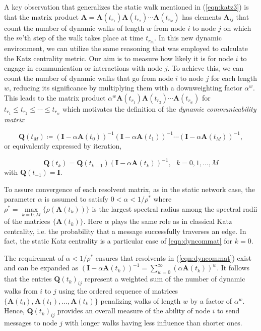 A key observation that generalizes the static walk mentioned in (\ref{eqn:katz3}) is that the matrix product $\mathbf{A} = \mathbf{A}(t_{r_1})\mathbf{A}(t_{r_2})\cdots \mathbf{A}(t_{r_w})$ has elements $\mathbf{A}_{ij}$ that count the number of dynamic walks of length $w$ from node $i$ to node $j$ on which the $m$'th step of the walk takes place at time $t_{r_m}$. In this new dynamic environment, we can utilize the same reasoning that was employed to calculate the Katz centrality metric. Our aim is to measure how likely it is for node $i$ to engage in communication or interactions with node $j$. To achieve this, we can count the number of dynamic walks that go from node $i$ to node $j$ for each length $w$, reducing its significance by multiplying them with a downweighting factor $\alpha^w$. This leads to the matrix product $\alpha^w\mathbf{A}(t_{r_1})\mathbf{A}(t_{r_2})\cdots \mathbf{A}(t_{r_w})$ for $t_{r_1}\le t_{r_2}\le \cdots \le t_{r_w}$ which motivates the definition of the \textit{dynamic communicability matrix}

\begin{equation}
\label{eqn:dyncommat}
    \mathbf{Q}(t_M) \coloneqq (\mathbf{I} - \alpha\mathbf{A}(t_0))^{-1} (\mathbf{I} - \alpha\mathbf{A}(t_1))^{-1} \cdots (\mathbf{I} - \alpha\mathbf{A}(t_M))^{-1},
\end{equation}
or equivalently expressed by iteration,

\begin{equation}
\label{eqn:dyncommatiter}
    \mathbf{Q}(t_k) = \mathbf{Q}(t_{k-1})(\mathbf{I} - \alpha\mathbf{A}(t_k))^{-1} , ~~~k=0,1,\dots,M
\end{equation}
with $\mathbf{Q}(t_{-1})=\mathbf{I}$.

To assure convergence of each resolvent matrix, as in the static network case, the parameter $\alpha$ is assumed to satisfy $0<\alpha<1/\rho^*$ where $\rho^* = \underset{k=0:M}{\max}\{\rho(\mathbf{A}(t_k))\}$ is the largest spectral radius among the spectral radii of the matrices $\{\mathbf{A}(t_k)\}$. Here $\alpha$ plays the same role as in classical Katz centrality, i.e. the probability that a message successfully traverses an edge. In fact, the static Katz centrality is a particular case of \eqref{eqn:dyncommat} for $k=0$.

The requirement of $\alpha < 1/\rho^*$ ensures that resolvents in (\ref{eqn:dyncommat}) exist and can be expanded as $(\mathbf{I} - \alpha\mathbf{A}(t_k))^{-1} = \sum_{w=0}^{\infty} (\alpha \mathbf{A}(t_k))^w$. It follows that the entries $\mathbf{Q}(t_k)_{ij}$ represent a weighted sum of the number of dynamic walks from $i$ to $j$ using the ordered sequence of matrices $\{\mathbf{A}(t_0),\mathbf{A}(t_1),\dots,\mathbf{A}(t_k)\}$ penalizing walks of length $w$ by a factor of $\alpha^w$. Hence, $\mathbf{Q}(t_k)_{ij}$ provides an overall measure of the ability of node $i$ to send messages to node $j$ with longer walks having less influence than shorter ones.

